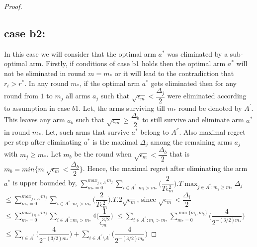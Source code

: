 \begin{proof}
\subsection{case b2:} 
In this case we will consider that the optimal arm $a^{*}$ was eliminated by a sub-optimal arm. Firstly, if conditions of case b1 holds then the optimal arm $a^{*}$ will not be eliminated in round $m=m_{*}$ or it will lead to the contradiction that $r_{i}>r^{*}$. In any round $m_{*}$, if the optimal arm $a^{*}$ gets eliminated then for any round from $1$ to $m_{j}$ all arms $a_{j}$ such that $\sqrt{\epsilon_{m}}<\dfrac{\Delta_{j}}{2}$ were eliminated according to assumption in case $b1$. Let, the arms surviving till $m_{*}$ round be denoted by $A^{'}$. This leaves any arm $a_{b}$ such that $\sqrt{\epsilon_{m}}\geq\dfrac{\Delta_{b}}{2}$ to still survive and eliminate arm $a^{*}$ in round $m_{*}$. Let, such arms that survive $a^{*}$ belong to $A^{''}$. Also maximal regret per step after eliminating $a^{*}$ is the maximal $\Delta_{j}$ among the remaining arms $a_{j}$ with $m_{j}\geq m_{*}$.  Let $m_{b}$ be the round when $\sqrt{\epsilon_{m}}<\dfrac{\Delta_{b}}{2}$ that is $m_{b}=min\lbrace m|\sqrt{\epsilon_{m}}<\dfrac{\Delta_{b}}{2}\rbrace$. Hence, the maximal regret after eliminating the arm $a^{*}$ is upper bounded by, 
\newline
$\sum_{m_{*}=0}^{max_{j\in A^{'}}m_{j}}\sum_{i\in A^{''}:m_{i}>m_{*}}\bigg(\dfrac{2}{T\epsilon_{m}^{2}} \bigg).T\max_{j\in A^{''}:m_{j}\geq m_{*}}{\Delta}_{j}$
\newline
\hspace*{0em}$\leq\sum_{m_{*}=0}^{max_{j\in A^{'}}m_{j}}\sum_{i\in A^{''}:m_{i}>m_{*}}\bigg(\dfrac{2}{T\epsilon_{m}^{2}} \bigg).T.2\sqrt{\epsilon_{m}}$, since $\sqrt{\epsilon_{m}}<\dfrac{\Delta_{i}}{2}$
\newline
\hspace*{0em}$\leq\sum_{m_{*}=0}^{max_{j\in A^{'}}m_{j}}\sum_{i\in A^{''}:m_{i}>m_{*}}4\bigg(\dfrac{1}{\epsilon_{m}^{3/2}} \bigg) $
\newline
\hspace*{0em}$\leq\sum_{i\in A^{''}:m_{i}>m_{*}}\sum_{m_{*}=0}^{\min{\lbrace m_{i},m_{b}\rbrace}}\bigg(\dfrac{4}{2^{-(3/2)m_{*}}} \bigg) $
\newline
\hspace*{0em}$\leq\sum_{i\in A^{'}}\bigg(\dfrac{4}{2^{-(3/2)m_{*}}} \bigg)+\sum_{i\in A^{''}\setminus A^{'}}\bigg(\dfrac{4}{2^{-(3/2)m_{b}}} \bigg)$

\end{proof}
